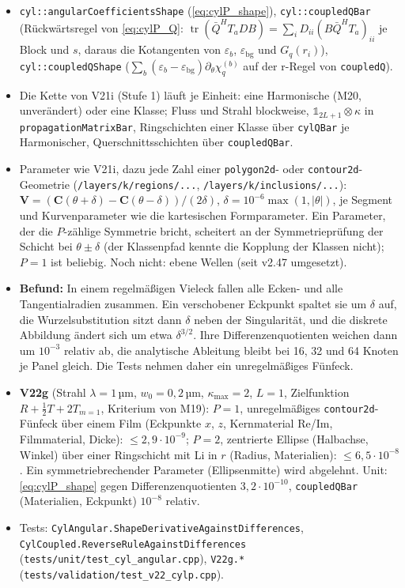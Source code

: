 \begin{itemize}[nosep]
  \item \verb|cyl::angularCoefficientsShape| (\eqref{eq:cylP_shape}), \verb|cyl::coupledQBar| (Rückwärtsregel von
        \eqref{eq:cylP_Q}: $\operatorname{tr}(\bar Q^H T_aDB)=\sum_iD_{ii}(B\bar Q^HT_a)_{ii}$ je Block und $s$, daraus die
        Kotangenten von $\varepsilon_b$, $\varepsilon_{\text{bg}}$ und $G_q(r_i)$), \verb|cyl::coupledQShape|
        ($\sum_b(\varepsilon_b-\varepsilon_{\text{bg}})\partial_\theta\chi^{(b)}_q$ auf der r-Regel von \verb|coupledQ|).
  \item Die Kette von V21i (Stufe 1) läuft je Einheit: eine Harmonische (M20, unverändert) oder eine Klasse; Fluss
        und Strahl blockweise, $\mathbb 1_{2L+1}\otimes\kappa$ in \verb|propagationMatrixBar|, Ringschichten einer Klasse
        über \verb|cylQBar| je Harmonischer, Querschnittsschichten über \verb|coupledQBar|.
  \item Parameter wie V21i, dazu jede Zahl einer \verb|polygon2d|- oder \verb|contour2d|-Geometrie
        (\verb|/layers/k/regions/...|, \verb|/layers/k/inclusions/...|): $\mathbf V=(\mathbf C(\theta+\delta)-\mathbf C(\theta-\delta))/(2\delta)$,
        $\delta=10^{-6}\max(1,|\theta|)$, je Segment und Kurvenparameter wie die kartesischen Formparameter. Ein Parameter,
        der die $P$-zählige Symmetrie bricht, scheitert an der Symmetrieprüfung der Schicht bei $\theta\pm\delta$ (der
        Klassenpfad kennte die Kopplung der Klassen nicht); $P=1$ ist beliebig. Noch nicht: ebene Wellen (seit v2.47
        umgesetzt).
  \item \textbf{Befund:} In einem regelmäßigen Vieleck fallen alle Ecken- und alle Tangentialradien zusammen. Ein
        verschobener Eckpunkt spaltet sie um $\delta$ auf, die Wurzelsubstitution sitzt dann $\delta$ neben der
        Singularität, und die diskrete Abbildung ändert sich um etwa $\delta^{3/2}$. Ihre Differenzenquotienten weichen
        dann um $10^{-3}$ relativ ab, die analytische Ableitung bleibt bei 16, 32 und 64 Knoten je Panel gleich. Die Tests
        nehmen daher ein unregelmäßiges Fünfeck.
  \item \textbf{V22g} (Strahl $\lambda=1$\,µm, $w_0=0{,}2$\,µm, $\kappa_{\max}=2$, $L=1$, Zielfunktion
        $R+\tfrac12T+2T_{m=1}$, Kriterium von M19): $P=1$, unregelmäßiges \verb|contour2d|-Fünfeck über einem Film
        (Eckpunkte $x$, $z$, Kernmaterial Re/Im, Filmmaterial, Dicke): $\le2{,}9\cdot10^{-9}$; $P=2$, zentrierte Ellipse
        (Halbachse, Winkel) über einer Ringschicht mit Li in $r$ (Radius, Materialien): $\le6{,}5\cdot10^{-8}$. Ein
        symmetriebrechender Parameter (Ellipsenmitte) wird abgelehnt. Unit: \eqref{eq:cylP_shape} gegen
        Differenzenquotienten $3{,}2\cdot10^{-10}$, \verb|coupledQBar| (Materialien, Eckpunkt) $10^{-8}$ relativ.
  \item Tests: \verb|CylAngular.ShapeDerivativeAgainstDifferences|, \verb|CylCoupled.ReverseRuleAgainstDifferences|
        (\verb|tests/unit/test_cyl_angular.cpp|), \verb|V22g.*| (\verb|tests/validation/test_v22_cylp.cpp|).
\end{itemize}

